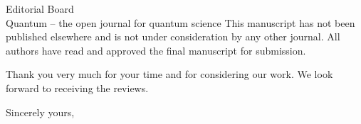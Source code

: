 \documentclass[11pt]{letter}
\begin{document}
\begin{letter}{
  Editorial Board \\
  Quantum -- the open journal for quantum science
}
This manuscript has not been published elsewhere and is not under consideration by any other journal. All authors have read and approved the final manuscript for submission. 

Thank you very much for your time and for considering our work. We look forward to receiving the reviews.

\closing{Sincerely yours,}

\end{letter}
\end{document}

